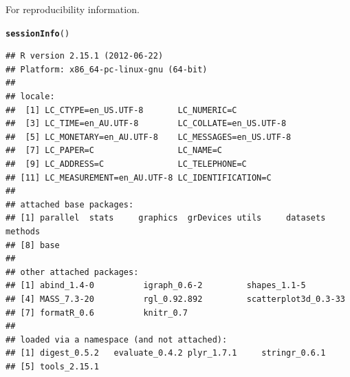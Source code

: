 \documentclass{article}\usepackage{graphicx, color}
\makeatletter
\newcommand{\hlfunctioncall}[1]{\textcolor[rgb]{0.501960784313725,0,0.329411764705882}{\textbf{#1}}}%
\newenvironment{kframe}{%
 \def\at@end@of@kframe{}%
 \ifinner\ifhmode%
  \def\at@end@of@kframe{\end{minipage}}%
  \begin{minipage}{\columnwidth}%
 \fi\fi%
 \def\FrameCommand##1{\hskip\@totalleftmargin \hskip-\fboxsep
 \colorbox{shadecolor}{##1}\hskip-\fboxsep
     \hskip-\linewidth \hskip-\@totalleftmargin \hskip\columnwidth}%
 \MakeFramed {\advance\hsize-\width
   \@totalleftmargin\z@ \linewidth\hsize
   \@setminipage}}%
 {\par\unskip\endMakeFramed%
 \at@end@of@kframe}
\newenvironment{knitrout}{}{} %
\makeatother
\begin{document}
\newpage
For reproducibility information.
\begin{knitrout}\scriptsize
{}\color{fgcolor}\begin{kframe}
\begin{alltt}
\hlfunctioncall{sessionInfo}()
\end{alltt}
\begin{verbatim}
## R version 2.15.1 (2012-06-22)
## Platform: x86_64-pc-linux-gnu (64-bit)
## 
## locale:
##  [1] LC_CTYPE=en_US.UTF-8       LC_NUMERIC=C              
##  [3] LC_TIME=en_AU.UTF-8        LC_COLLATE=en_US.UTF-8    
##  [5] LC_MONETARY=en_AU.UTF-8    LC_MESSAGES=en_US.UTF-8   
##  [7] LC_PAPER=C                 LC_NAME=C                 
##  [9] LC_ADDRESS=C               LC_TELEPHONE=C            
## [11] LC_MEASUREMENT=en_AU.UTF-8 LC_IDENTIFICATION=C       
## 
## attached base packages:
## [1] parallel  stats     graphics  grDevices utils     datasets  methods  
## [8] base     
## 
## other attached packages:
## [1] abind_1.4-0          igraph_0.6-2         shapes_1.1-5        
## [4] MASS_7.3-20          rgl_0.92.892         scatterplot3d_0.3-33
## [7] formatR_0.6          knitr_0.7           
## 
## loaded via a namespace (and not attached):
## [1] digest_0.5.2   evaluate_0.4.2 plyr_1.7.1     stringr_0.6.1 
## [5] tools_2.15.1  
\end{verbatim}
\end{kframe}
\end{knitrout}
\end{document}
